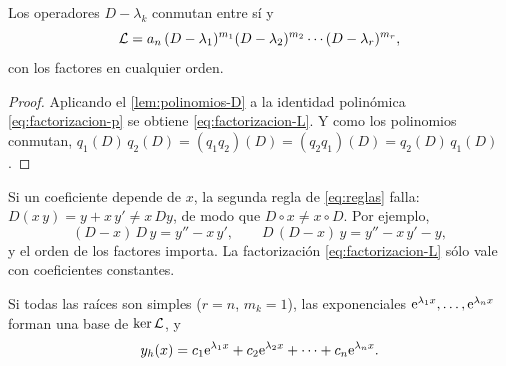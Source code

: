 \begin{proposicion}\label{prop:factorizacion}
Los operadores $D-\lambda_k$ conmutan entre sí y
\begin{equation}\label{eq:factorizacion-L}
  \mathcal{L}=a_n\,(D-\lambda_1)^{m_1}(D-\lambda_2)^{m_2}\cdots(D-\lambda_r)^{m_r},
\end{equation}
con los factores en cualquier orden.
\end{proposicion}

\begin{proof}
Aplicando el \cref{lem:polinomios-D} a la identidad polinómica
\eqref{eq:factorizacion-p} se obtiene \eqref{eq:factorizacion-L}. Y como los
polinomios conmutan,
$q_1(D)\,q_2(D)=(q_1q_2)(D)=(q_2q_1)(D)=q_2(D)\,q_1(D)$.
\end{proof}

\begin{observacion}\label{obs:no-conmutan}
Si un coeficiente depende de $x$, la segunda regla de \eqref{eq:reglas}
falla: $D(x\,y)=y+x\,y'\neq x\,Dy$, de modo que $D\circ x\neq x\circ D$. Por
ejemplo,
\[
  (D-x)\,D\,y=y''-x\,y',\qquad D\,(D-x)\,y=y''-x\,y'-y ,
\]
y el orden de los factores importa. La factorización
\eqref{eq:factorizacion-L} sólo vale con coeficientes constantes.
\end{observacion}

\begin{corolario}\label{cor:simples}
Si todas las raíces son simples ($r=n$, $m_k=1$), las exponenciales
$\mathrm{e}^{\lambda_1x},\dots,\mathrm{e}^{\lambda_nx}$ forman una base de $\operatorname{ker}\mathcal{L}$, y
\begin{equation}\label{eq:simples}
  y_h(x)=c_1\mathrm{e}^{\lambda_1x}+c_2\mathrm{e}^{\lambda_2x}+\dots+c_n\mathrm{e}^{\lambda_nx}.
\end{equation}
\end{corolario}

